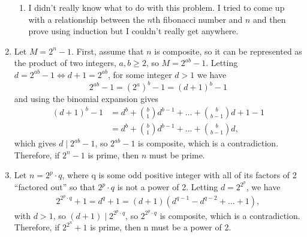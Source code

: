 \documentclass[12pt]{article}
\begin{document}
\begin{enumerate}
\begin{enumerate}
        \item I didn't really know what to do with this problem. I tried to come 
        up with a relationship between the $n$th fibonacci number and $n$ and then 
        prove using induction but I couldn't really get anywhere.
    \end{enumerate} 
    \item Let $M = 2^n -1$. First, assume that $n$ is composite, so it can be represented as the 
    product of two integers, $a,b \geq 2$, so $M = 2^{ab}-1$. Letting $d = 2^{ab} -1 \iff d + 1 = 2^{ab}$, for some integer $d > 1$ 
    we have \[2^{ab}-1 = (2^a)^b-1 = (d+1)^b -1\] and using the binomial expansion 
    gives \begin{align*}
        (d+1)^b -1 &= d^b + {b \choose1}d^{b-1} + \ldots + {b \choose b-1}d+ 1 -1\\
        &= d^b + {b \choose1}d^{b-1} + \ldots + {b \choose b-1}d,
    \end{align*}
    which gives $d \mid 2^{ab}-1$, so $2^{ab} -1$ is composite, which is a contradiction. 
    Therefore, if $2^n - 1$ is prime, then $n$ must be prime.  
    \item Let $n = 2^p \cdot q$, where q is some odd positive integer with all of its 
    factors of 2 ``factored out'' so that $2^p \cdot q$ is not a power of 2. Letting $d = 2^{2^p}$,
    we have \begin{align*}
        2^{2^p \cdot q} +1  = d^q +1 = (d+1)(d^{q-1} - d^{q-2} + \ldots +1),
    \end{align*}
    with $d > 1$, so $(d+1) \mid 2^{2^p \cdot q }$, so $2^{2^p \cdot q }$ is composite, 
    which is a contradiction. Therefore, if $2^{2^n} +1$ is prime, then n must 
    be a power of 2.
\end{enumerate}
\end{document}
